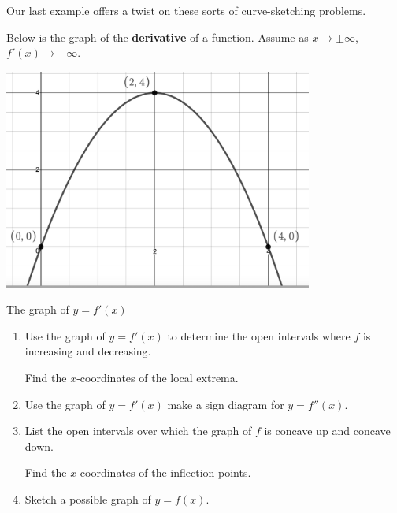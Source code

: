 \documentclass{ximera}
\begin{document}
\medskip

Our last example offers a twist on these sorts of curve-sketching problems.

\pagebreak

\begin{example}\label{graphfromderivativegraphex} Below is the graph of the \textbf{derivative} of a function.  Assume as $x \rightarrow \pm \infty$, $f'(x) \rightarrow -\infty$.


\begin{center}

\includegraphics[width=4in]{./AppDerivativesGraphics/derivgraph.png}

The graph of $y=f'(x)$

\end{center}

\begin{enumerate}

\item  Use the graph of $y=f'(x)$ to determine the open intervals where $f$ is increasing and decreasing.  

\medskip

Find the $x$-coordinates of the local extrema.

\medskip

\item  Use the graph of $y=f'(x)$ make a sign diagram for $y=f''(x)$.

\medskip

\item  List the open intervals over which the graph of $f$ is concave up and concave down.  

\medskip

Find the $x$-coordinates of the inflection points. 

\medskip

\item  Sketch a possible graph of $y = f(x)$.


\end{enumerate}
\end{example}
\end{document}

